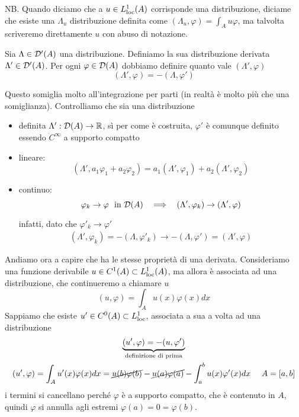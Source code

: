NB. Quando diciamo che a $u\in L^{1}_{\operatorname{loc}}(A)$ corrisponde una distribuzione, diciame che esiste una $\Lambda_{u}$ distribuzione definita come $(\Lambda_{u}, \varphi) = \int_{A} u\varphi $, ma talvolta scriveremo direttamente $u$ con abuso di notazione.
\begin{defn}
Sia $\Lambda \in \mathcal{D}'(A)$ una distribuzione. Definiamo la sua distribuzione derivata $\Lambda'\in \mathcal{D}'(A)$. Per ogni $\varphi \in \mathcal{D}(A)$ dobbiamo definire quanto vale $(\Lambda', \varphi)$
\begin{equation*}
\boxed{(\Lambda', \varphi) = - (\Lambda, \varphi')}
\end{equation*}
\end{defn}
Questo somiglia molto all'integrazione per parti (in realtà è molto più che una somiglianza). Controlliamo che sia una distribuzione
\begin{itemize}
\item definita $\Lambda': \mathcal{D}(A)\rightarrow \mathbb{R}$, sì per come è costruita, $\varphi'$ è comunque definito essendo $C^{\infty}$ a supporto compatto
\item lineare:
\begin{equation*}
(\Lambda', a_{1} \varphi_{1} + a_{2} \varphi_{2}) = a_{1}(\Lambda', \varphi_{1}) + a_{2}(\Lambda', \varphi_{2})
\end{equation*}
\item continuo:
\begin{equation*}
\varphi_{k}\rightarrow \varphi \ \ \text{in} \ \mathcal{D}(A) \ \ \implies \ \ (\Lambda', \varphi_{k})\rightarrow (\Lambda', \varphi)
\end{equation*}

infatti, dato che $\varphi'_{k}\rightarrow \varphi'$
\begin{gather*}
(\Lambda', \varphi_{k}) = - (\Lambda, \varphi'_{k})\rightarrow - (\Lambda, \varphi') = (\Lambda', \varphi)
\end{gather*}
\end{itemize}

Andiamo ora a capire che ha le stesse proprietà di una derivata. Consideriamo una funzione derivabile $u\in C^{1}(A) \subset L^{1}_{\operatorname{loc}}(A)$, ma allora è associata ad una distribuzione, che continueremo a chiamare $u$
\begin{equation*}
(u, \varphi) = \int_{A} u(x) \varphi (x) dx
\end{equation*}
Sappiamo che esiste $u'\in C^{0}(A) \subset L^{1}_{\operatorname{loc}}$, associata a sua a volta ad una distribuzione
\begin{gather*}
\underbrace{(u', \varphi) = - (u, \varphi')}_{\text{definizione di prima}}\\
(u', \varphi) = \int_{A} u'(x) \varphi (x) dx = \cancel{u(b) \varphi (b)} - \cancel{u(a) \varphi (a)} - \int^{b}_{a} u(x) \varphi'(x) dx\ \ \ \ A =[a, b]
\end{gather*}
i termini si cancellano perché $\varphi $ è a supporto compatto, che è contenuto in $A$, quindi $\varphi $ si annulla agli estremi $\varphi (a) = 0 = \varphi (b)$.

